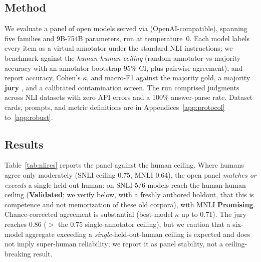 \subsection{Method}
We evaluate a panel of \STHRmodels{} open models served via \PROVIDER{} (OpenAI-compatible), spanning five families
and 9B-754B parameters, run at temperature~0. Each model labels every item as a virtual annotator under the
standard NLI instructions; we benchmark against the \emph{human-human ceiling} (random-annotator-vs-majority
accuracy with an annotator bootstrap 95\% CI, plus pairwise agreement), and report accuracy, Cohen's $\kappa$, and
macro-F1 against the majority gold, a majority \textbf{jury} \citep{verga2024poll}, and a calibrated
contamination screen. The run comprised \NLInjudg{} judgments across \NLIndat{} NLI datasets with zero API errors
and a 100\% answer-parse rate. Dataset cards, prompts, and metric definitions are in
Appendices~\ref{app:protocol} to~\ref{app:robust}.

\subsection{Results}
Table~\ref{tab:nlires} reports the panel against the human ceiling. Where humans agree only moderately
(SNLI ceiling 0.75, MNLI 0.64), the open panel \emph{matches or exceeds} a single held-out human: on SNLI 5/6 models
reach the human-human ceiling (\textbf{Validated}; we verify below, with a freshly authored holdout, that this is competence and not memorization of these old corpora), with MNLI \textbf{Promising}.
Chance-corrected agreement is substantial (best-model $\kappa$ up to 0.71). The jury reaches 0.86 ($>$ the 0.75
single-annotator ceiling), but we caution that a six-model aggregate exceeding a \emph{single}-held-out-human ceiling
is expected and does not imply super-human reliability; we report it as panel stability, not a ceiling-breaking
result.

\begin{table}[t]\centering\small
\caption{Study 3 (NLI). Open panel vs the human-human ceiling. Ceiling = random-annotator-vs-majority accuracy;
macro-F1 is the best model's chance-corrected score.}
\label{tab:nlires}

\end{table}

